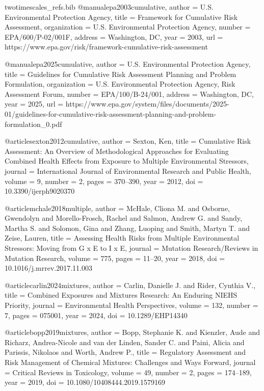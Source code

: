 \begin{filecontents*}{twotimescales_refs.bib}
	@manual{epa2003cumulative,
		author       = {{U.S. Environmental Protection Agency}},
		title        = {Framework for Cumulative Risk Assessment},
		organization = {U.S. Environmental Protection Agency},
		number       = {EPA/600/P-02/001F},
		address      = {Washington, DC},
		year         = {2003},
		url          = {https://www.epa.gov/risk/framework-cumulative-risk-assessment}
	}
	
	@manual{epa2025cumulative,
		author       = {{U.S. Environmental Protection Agency}},
		title        = {Guidelines for Cumulative Risk Assessment Planning and Problem Formulation},
		organization = {U.S. Environmental Protection Agency, Risk Assessment Forum},
		number       = {EPA/100/B-24/001},
		address      = {Washington, DC},
		year         = {2025},
		url          = {https://www.epa.gov/system/files/documents/2025-01/guidelines-for-cumulative-risk-assessment-planning-and-problem-formulation_0.pdf}
	}
	
	@article{sexton2012cumulative,
		author  = {Sexton, Ken},
		title   = {Cumulative Risk Assessment: An Overview of Methodological Approaches for Evaluating Combined Health Effects from Exposure to Multiple Environmental Stressors},
		journal = {International Journal of Environmental Research and Public Health},
		volume  = {9},
		number  = {2},
		pages   = {370--390},
		year    = {2012},
		doi     = {10.3390/ijerph9020370}
	}
	
	@article{mchale2018multiple,
		author  = {McHale, Cliona M. and Osborne, Gwendolyn and Morello-Frosch, Rachel and Salmon, Andrew G. and Sandy, Martha S. and Solomon, Gina and Zhang, Luoping and Smith, Martyn T. and Zeise, Lauren},
		title   = {Assessing Health Risks from Multiple Environmental Stressors: Moving from G x E to I x E},
		journal = {Mutation Research/Reviews in Mutation Research},
		volume  = {775},
		pages   = {11--20},
		year    = {2018},
		doi     = {10.1016/j.mrrev.2017.11.003}
	}
	
	@article{carlin2024mixtures,
		author  = {Carlin, Danielle J. and Rider, Cynthia V.},
		title   = {Combined Exposures and Mixtures Research: An Enduring NIEHS Priority},
		journal = {Environmental Health Perspectives},
		volume  = {132},
		number  = {7},
		pages   = {075001},
		year    = {2024},
		doi     = {10.1289/EHP14340}
	}
	
	@article{bopp2019mixtures,
		author  = {Bopp, Stephanie K. and Kienzler, Aude and Richarz, Andrea-Nicole and van der Linden, Sander C. and Paini, Alicia and Parissis, Nikolaos and Worth, Andrew P.},
		title   = {Regulatory Assessment and Risk Management of Chemical Mixtures: Challenges and Ways Forward},
		journal = {Critical Reviews in Toxicology},
		volume  = {49},
		number  = {2},
		pages   = {174--189},
		year    = {2019},
		doi     = {10.1080/10408444.2019.1579169}
	}
	

\end{filecontents*}
